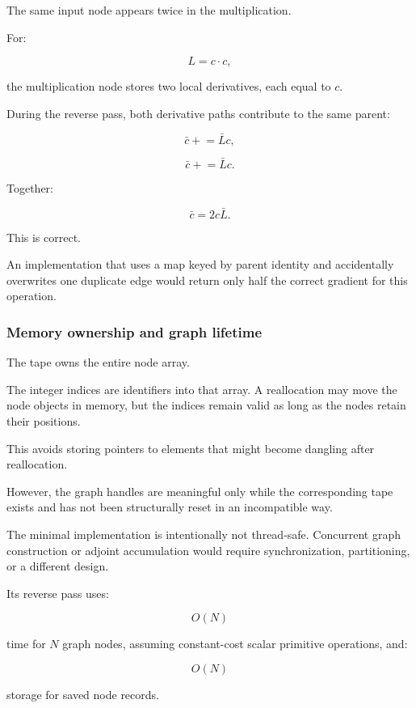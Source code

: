 The same input node appears twice in the multiplication.

For:

\[
L=c\cdot c,
\]

the multiplication node stores two local derivatives, each equal to \(c\).

During the reverse pass, both derivative paths contribute to the same parent:

\[
\bar c\mathrel{+}=\bar Lc,
\]

\[
\bar c\mathrel{+}=\bar Lc.
\]

Together:

\[
\bar c=2c\bar L.
\]

This is correct.

An implementation that uses a map keyed by parent identity and accidentally overwrites one duplicate edge would return only half the correct gradient for this operation.

\subsubsection{Memory ownership and graph lifetime}\label{02-foundations-ii-ch022-memory-ownership-and-graph-lifetime}

\hypertarget{02-foundations-ii-ch022-memory-ownership-and-graph-lifetime}{}

The tape owns the entire node array.

The integer indices are identifiers into that array. A  reallocation may move the node objects in memory, but the indices remain valid as long as the nodes retain their positions.

This avoids storing pointers to elements that might become dangling after reallocation.

However, the graph handles are meaningful only while the corresponding tape exists and has not been structurally reset in an incompatible way.

The minimal implementation is intentionally not thread-safe. Concurrent graph construction or adjoint accumulation would require synchronization, partitioning, or a different design.

Its reverse pass uses:

\[
O(N)
\]

time for \(N\) graph nodes, assuming constant-cost scalar primitive operations, and:

\[
O(N)
\]

storage for saved node records.

